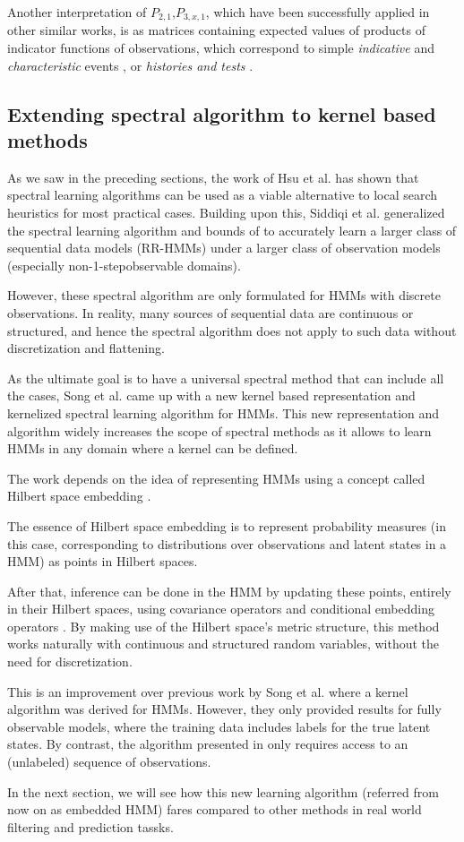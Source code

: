 Another interpretation of $ {P}_{2,1} $,$ {P}_{3,x,1} $, which have been successfully applied in other similar works, is as matrices containing expected values of products of indicator functions of observations, which correspond to simple \textit{indicative} and \textit{characteristic} events \cite{ref9},
or \textit{histories and tests} \cite{ref10}.


\subsection{Extending spectral algorithm to kernel based methods}

As we saw in the preceding sections, the work of Hsu et al.\cite{ref2} has shown that spectral learning algorithms can be used as a viable alternative to local search heuristics for most practical cases. Building upon this, Siddiqi et al.\cite{ref7} generalized the spectral learning algorithm
and bounds of \cite{ref2} to accurately learn
a larger class of sequential data models (RR-HMMs)
under a larger class of observation models (especially non-1-stepobservable domains).


However, these spectral algorithm are only formulated
for HMMs with discrete observations.
In reality, many sources of sequential data are continuous or structured, and hence the spectral algorithm does not apply to such data without discretization and flattening.

As the ultimate goal is to have a universal spectral method that can include all the cases, Song et al.\cite{ref20} came up with a new kernel based
representation and kernelized spectral learning
algorithm for HMMs. This new representation and algorithm widely increases the scope of spectral methods as it allows to learn HMMs in any domain where a kernel can be defined. 


The work depends on the idea of representing HMMs using a 
concept called Hilbert space embedding \cite{ref21} \cite{ref22}. 

The essence of Hilbert space embedding is to represent probability measures (in this case, corresponding to distributions over observations and latent states in a HMM) as points in Hilbert spaces. 

After that, inference can be done in the HMM by updating these points, entirely in their Hilbert spaces, using covariance operators \cite{ref23} and conditional
embedding operators \cite{ref24}. By making use of the Hilbert space’s metric structure, this method works naturally with continuous and structured
random variables, without the need for discretization.

This is an improvement over previous work by Song et al.\cite{ref24} where a kernel algorithm was derived for HMMs. However, they only provided results for fully observable models, where the training data includes labels
for the true latent states. By contrast, the algorithm presented in \cite{ref20} only requires access to an (unlabeled) sequence of observations.

In the next section, we will see how this new learning algorithm (referred from now on as embedded HMM) fares compared to other methods in real world filtering and prediction tassks.